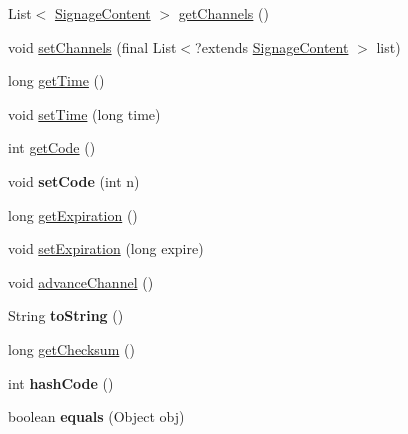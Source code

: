 \begin{DoxyCompactItemize}
\item 
List$<$ \hyperlink{interfacegov_1_1fnal_1_1ppd_1_1dd_1_1signage_1_1SignageContent}{Signage\-Content} $>$ \hyperlink{classgov_1_1fnal_1_1ppd_1_1dd_1_1channel_1_1ChannelPlayList_a4a45d0e640ddc2548f37bd6c1c997f11}{get\-Channels} ()
\item 
void \hyperlink{classgov_1_1fnal_1_1ppd_1_1dd_1_1channel_1_1ChannelPlayList_abfcd48d8d992007dd8b7afd3ea1e1dd2}{set\-Channels} (final List$<$?extends \hyperlink{interfacegov_1_1fnal_1_1ppd_1_1dd_1_1signage_1_1SignageContent}{Signage\-Content} $>$ list)
\item 
long \hyperlink{classgov_1_1fnal_1_1ppd_1_1dd_1_1channel_1_1ChannelPlayList_aeffef12153803eb9b53b8465605926a9}{get\-Time} ()
\item 
void \hyperlink{classgov_1_1fnal_1_1ppd_1_1dd_1_1channel_1_1ChannelPlayList_ac1efd270a0a6ac0c723a6cbd7d97b9a5}{set\-Time} (long time)
\item 
int \hyperlink{classgov_1_1fnal_1_1ppd_1_1dd_1_1channel_1_1ChannelPlayList_a63f0a55d5f714b9b510b5d9b52ab5294}{get\-Code} ()
\item 
\hypertarget{classgov_1_1fnal_1_1ppd_1_1dd_1_1channel_1_1ChannelPlayList_a054421b30bfa598b9f907facbba2dc6c}{void {\bfseries set\-Code} (int n)}\label{classgov_1_1fnal_1_1ppd_1_1dd_1_1channel_1_1ChannelPlayList_a054421b30bfa598b9f907facbba2dc6c}

\item 
long \hyperlink{classgov_1_1fnal_1_1ppd_1_1dd_1_1channel_1_1ChannelPlayList_a6af41cecbc1b1c903c5dc7544466b169}{get\-Expiration} ()
\item 
void \hyperlink{classgov_1_1fnal_1_1ppd_1_1dd_1_1channel_1_1ChannelPlayList_a6685e37b070296e6c0e68604d3d61b8a}{set\-Expiration} (long expire)
\item 
void \hyperlink{classgov_1_1fnal_1_1ppd_1_1dd_1_1channel_1_1ChannelPlayList_a98bb559bcfd42b2f26aeb2082e2e89fd}{advance\-Channel} ()
\item 
\hypertarget{classgov_1_1fnal_1_1ppd_1_1dd_1_1channel_1_1ChannelPlayList_ab53b318aa5cdd56a200e404912c1050b}{String {\bfseries to\-String} ()}\label{classgov_1_1fnal_1_1ppd_1_1dd_1_1channel_1_1ChannelPlayList_ab53b318aa5cdd56a200e404912c1050b}

\item 
long \hyperlink{classgov_1_1fnal_1_1ppd_1_1dd_1_1channel_1_1ChannelPlayList_a7a41f216f9725c9167dbabfe1332e0f6}{get\-Checksum} ()
\item 
\hypertarget{classgov_1_1fnal_1_1ppd_1_1dd_1_1channel_1_1ChannelPlayList_ad4dce7869f8dc2b89c663dd40c68be7f}{int {\bfseries hash\-Code} ()}\label{classgov_1_1fnal_1_1ppd_1_1dd_1_1channel_1_1ChannelPlayList_ad4dce7869f8dc2b89c663dd40c68be7f}

\item 
\hypertarget{classgov_1_1fnal_1_1ppd_1_1dd_1_1channel_1_1ChannelPlayList_aa117d6780ca09a5e94592efcee06cc1c}{boolean {\bfseries equals} (Object obj)}\label{classgov_1_1fnal_1_1ppd_1_1dd_1_1channel_1_1ChannelPlayList_aa117d6780ca09a5e94592efcee06cc1c}

\end{DoxyCompactItemize}



